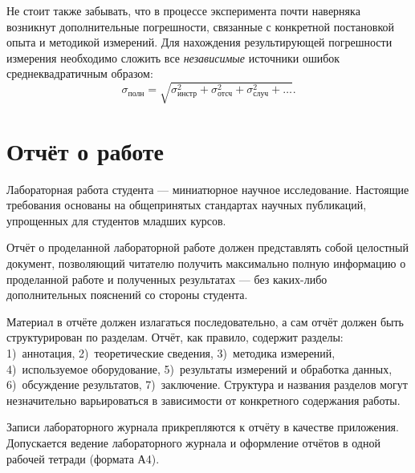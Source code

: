 Не стоит также забывать, что в процессе эксперимента почти наверняка
возникнут дополнительные погрешности, связанные с конкретной постановкой
опыта и методикой измерений. Для нахождения результирующей погрешности
измерения необходимо сложить все \emph{независимые} источники ошибок
среднеквадратичным образом:
\[\sigma_{\text{полн}}=\sqrt{\sigma_{\text{инстр}}^{2}+
\sigma_{\text{отсч}}^{2}+\sigma_{\text{случ}}^{2}+\ldots}.\]


\section{Отчёт о работе}

Лабораторная работа студента --- миниатюрное научное исследование.
Настоящие требования основаны на общепринятых стандартах научных публикаций,
упрощенных для студентов младших курсов.

Отчёт о проделанной лабораторной работе должен представлять собой
целостный документ, позволяющий читателю получить максимально полную
информацию о проделанной работе и полученных результатах ---
без каких-либо дополнительных пояснений со стороны студента.

Материал в отчёте должен излагаться последовательно, а сам отчёт должен
быть структурирован по разделам. Отчёт, как правило, содержит разделы:
1)~аннотация, 2)~теоретические сведения, 3)~методика измерений,
4)~используемое оборудование, 5)~результаты измерений и обработка данных,
6)~обсуждение результатов, 7)~заключение. Структура и названия разделов
могут незначительно варьироваться в зависимости от конкретного содержания
работы.

Записи лабораторного журнала прикрепляются к отчёту в качестве приложения.
Допускается ведение лабораторного журнала и оформление отчётов в одной
рабочей тетради (формата А4).


